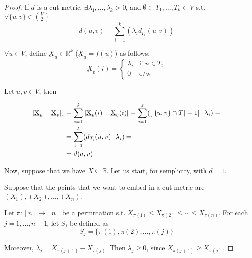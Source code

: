     \begin{proof}
        If $d$ is a cut metric, $\exists \lambda_1, \dots, \lambda_k > 0$, and $\emptyset \subset T_1, \dots, T_k \subset V$ s.t. $\forall \{u,v\} \in \binom{V}{2}$
        \[ d(u,v) = \sum_{i=1}^{k}(\lambda_i d_{T_i}(u,v)) \]

        $\forall u \in V$, define $\underbar{X}_u \in \mathbb{R}^k$ ($\underbar{X}_u = f(u)$) as follows:
        \begin{equation}
            \underbar{X}_u(i) = 
            \begin{cases}
                \lambda_i   & \text{if } u \in T_i\\
                0           & \text{o/w}
            \end{cases}
        \end{equation}

        Let $u,v \in V$, then

        \begin{equation*}
            \begin{split}
                \vert \underbar{X}_u - \underbar{X}_v \vert_1 &= \sum_{i=1}^{k}\vert \underbar{X}_u(i) - \underbar{X}_v(i) \vert = \sum_{i=1}^{k}([\vert \{u,v\} \cap T \vert = 1] \cdot \lambda_i) =\\
                    &= \sum_{i=1}^{k}(d_{T_i}(u,v) \cdot \lambda_i) =\\
                    &= d(u,v)
            \end{split}
        \end{equation*}

        Now, suppose that we have $X \subseteq \mathbb{R}$.
        Let us start, for semplicity, with $d=1$.

        Suppose that the points that we want to embed in a cut metric are $(X_1), (X_2), \dots, (X_n)$.

        Let $\pi : [n] \rightarrow [n]$ be a permutation s.t. $X_{\pi(1)} \leq X_{\pi(2)} \leq \cdots \leq X_{\pi(n)}$.
        For each $j = 1, \dots, n-1$, let $S_j$ be defined as
        \[ S_j = \{ \pi(1), \pi(2), \dots, \pi(j) \} \]

        Moreover, $\lambda_j = X_{\pi(j+1)} - X_{\pi(j)}$.
        Then $\lambda_j \geq 0$, since $X_{\pi(j+1)} \geq X_{\pi(j)}$.


\end{proof}
